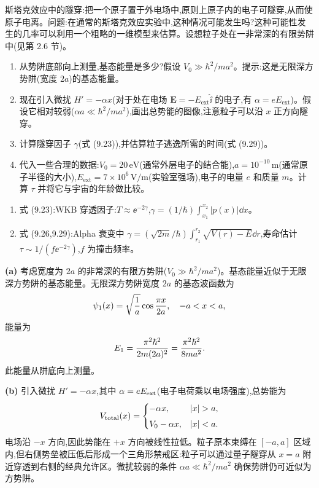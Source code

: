 \begin{question}
斯塔克效应中的隧穿:把一个原子置于外电场中,原则上原子内的电子可隧穿,从而使原子电离。问题:在通常的斯塔克效应实验中,这种情况可能发生吗?这种可能性发生的几率可以利用一个粗略的一维模型来估算。设想粒子处在一非常深的有限势阱中(见第 2.6 节)。
\begin{enumerate}
\item 从势阱底部向上测量,基态能量是多少?假设 $V_0\gg\hbar^2/ma^2$。提示:这是无限深方势阱(宽度 $2a$)的基态能量。
\item 现在引入微扰 $H'=-\alpha x$(对于处在电场 $\mathbf E=-E_{\mathrm{ext}}\hat{\mathbf \ii}$ 的电子,有 $\alpha=eE_{\mathrm{ext}}$)。假设它相对较弱($\alpha a\ll\hbar^2/ma^2$),画出总势能的图像,注意粒子可以沿 $x$ 正方向隧穿。
\item 计算隧穿因子 $\gamma$(式 (9.23)),并估算粒子逃逸所需的时间(式 (9.29))。
\item 代入一些合理的数据:$V_0=20\,\mathrm{eV}$(通常外层电子的结合能),$a=10^{-10}\,\mathrm{m}$(通常原子半径的大小),$E_{\mathrm{ext}}=7\times10^6\,\mathrm{V/m}$(实验室强场),电子的电量 $e$ 和质量 $m$。计算 $\tau$ 并将它与宇宙的年龄做比较。
\end{enumerate}

\par\smallskip
{}
\begin{enumerate}[leftmargin=2.2em,itemsep=0.12em,topsep=0.12em,parsep=0pt]
\item 式 (9.23):WKB 穿透因子:$T\approx \ee^{-2\gamma}$,$\gamma=(1/\hbar)\int_{x_1}^{x_2}|p(x)|\dd x$。
\item 式 (9.26,9.29):Alpha 衰变中 $\gamma=(\sqrt{2m}/\hbar)\int_{r_1}^{r_2}\sqrt{V(r)-E}\dd r$,寿命估计 $\tau\sim 1/(f \ee^{-2\gamma})$,$f$ 为撞击频率。
\end{enumerate}

\begin{solution}
\textbf{(a)} 考虑宽度为 $2a$ 的非常深的有限方势阱($V_0\gg\hbar^2/ma^2$)。基态能量近似于无限深方势阱的基态能量。无限深方势阱宽度 $2a$ 的基态波函数为
\[
\psi_1(x)=\sqrt{1\over a}\cos{\pi x\over 2a},\quad -a<x<a,
\]
能量为
\[
E_1={\pi^2\hbar^2\over 2m(2a)^2}={\pi^2\hbar^2\over 8ma^2}.
\]
此能量从阱底向上测量。

\textbf{(b)} 引入微扰 $H'=-\alpha x$,其中 $\alpha=eE_{\rm ext}$(电子电荷乘以电场强度),总势能为
\[
V_{\rm total}(x)=\begin{cases}
-\alpha x, & |x|>a,\\[4pt]
V_0-\alpha x, & |x|<a.
\end{cases}
\]
电场沿 $-x$ 方向,因此势能在 $+x$ 方向被线性拉低。粒子原本束缚在 $[-a,a]$ 区域内,但右侧势垒被压低后形成一个三角形禁戒区:粒子可以通过量子隧穿从 $x=a$ 附近穿透到右侧的经典允许区。微扰较弱的条件 $\alpha a\ll\hbar^2/ma^2$ 确保势阱仍可近似为方势阱。


\end{solution}
\end{question}
